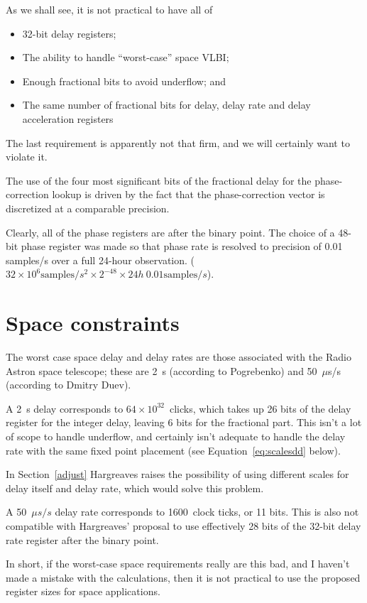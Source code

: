 \documentclass[a4paper]{article}
\begin{document}
As we shall see, it is not practical to have all of
\begin{itemize}
\item 32-bit delay registers;
\item The ability to handle ``worst-case'' space VLBI;
\item Enough fractional bits to avoid underflow; and
\item The same number of fractional bits for delay, delay rate and delay acceleration registers
\end{itemize}

The last requirement is apparently not that firm, and we will certainly want to violate it.

The use of the four most significant bits of the fractional delay for the phase-correction lookup is driven by the fact that the phase-correction vector is discretized at a comparable precision.

Clearly, all of the phase registers are after the binary point.  The choice of a 48-bit phase register was made so that phase rate is resolved to precision of 0.01 samples/s over a full 24-hour observation.  ($32\times10^6 \mathrm{samples}/s^2 \times 2^{-48} \times 24 h ~ 0.01 \mathrm{samples}/s$).


\section{Space constraints}

The worst case space delay and delay rates are those associated with the Radio Astron space telescope; these are 2~s (according to Pogrebenko) and 50~$\mu$s/s (according to Dmitry Duev).

A 2~s delay corresponds to $64\times10^{32}$~clicks, which takes up 26 bits of the delay register for the integer delay, leaving 6 bits for the fractional part.  This isn't a lot of scope to handle underflow, and certainly isn't adequate to handle the delay rate with the same fixed point placement (see Equation~\ref{eq:scalesdd} below).  

In Section~\ref{adjust} Hargreaves raises the possibility of using different scales for delay itself and delay rate, which would solve this problem.

A 50~$\mu s/s$ delay rate corresponds to 1600~clock ticks, or 11 bits. This is also not compatible with Hargreaves' proposal to use effectively 28 bits of the 32-bit delay rate register after the binary point.

In short, if the worst-case space requirements really are this bad, and I haven't made a mistake with the calculations, then it is not practical to use the proposed register sizes for space applications.
\end{document}

